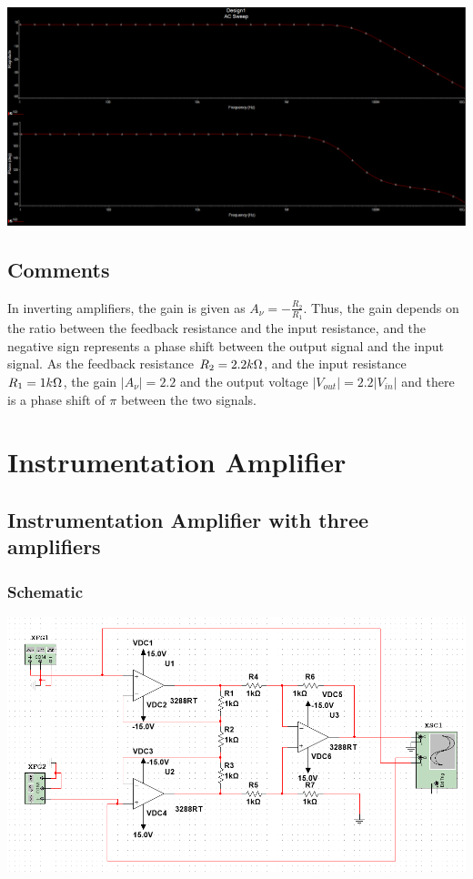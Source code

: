 \documentclass[a4paper, 12pt, english]{article}
\newenvironment{Figure}
  {\par\medskip\noindent\minipage{\linewidth}}
  {\endminipage\par\medskip}
\begin{document}
\begin{Figure}
 \centering
 \includegraphics[width=\linewidth, scale=2]{images/invertingFrequencyResponseSin.png}
\end{Figure}

\subsection{Comments}
In inverting amplifiers, the gain is given as \( A_{\nu} = -\frac{R_{2}}{R_{1}} \). Thus, the gain depends on the ratio between the feedback resistance and the input resistance, and the negative sign represents a phase shift between the output signal and the input signal. As the feedback resistance \( R_{2} = 2.2k\ohm \), and the input resistance \( R_{1} = 1k\ohm \), the gain \( |A_{\nu}| = 2.2 \) and the output voltage \( |V_{out}| = 2.2|V_{in}| \) and there is a phase shift of $\pi$ between the two signals.

\newpage
\section{Instrumentation Amplifier}
\subsection{Instrumentation Amplifier with three amplifiers}
\subsubsection{Schematic}
\begin{Figure}
 \centering
 \includegraphics[width=1.2\linewidth, scale=2]{images/Instrumentation3opamp circuit.png}
\end{Figure}
\end{document}
